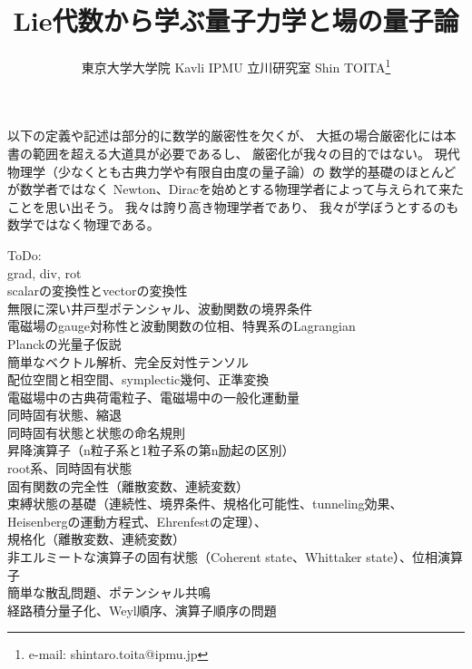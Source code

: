 \documentclass[dvipdfmx]{jsarticle}
\title{Lie代数から学ぶ量子力学と場の量子論}
\author{東京大学大学院 Kavli IPMU 立川研究室 \hspace{15pt}Shin TOITA\thanks{e-mail: shintaro.toita@ipmu.jp}}
\begin{document}
\maketitle
\vspace{-4zh}

\tableofcontents
\newpage

以下の定義や記述は部分的に数学的厳密性を欠くが、
大抵の場合厳密化には本書の範囲を超える大道具が必要であるし、
厳密化が我々の目的ではない。
現代物理学（少なくとも古典力学や有限自由度の量子論）の
数学的基礎のほとんどが数学者ではなく
Newton、Diracを始めとする物理学者によって与えられて来たことを思い出そう。
我々は誇り高き物理学者であり、
我々が学ぼうとするのも数学ではなく物理である。

ToDo:
\\grad, div, rot
\\scalarの変換性とvectorの変換性
\\無限に深い井戸型ポテンシャル、波動関数の境界条件
\\電磁場のgauge対称性と波動関数の位相、特異系のLagrangian
\\Planckの光量子仮説 
\\簡単なベクトル解析、完全反対性テンソル
\\配位空間と相空間、symplectic幾何、正準変換
\\電磁場中の古典荷電粒子、電磁場中の一般化運動量
\\同時固有状態、縮退
\\同時固有状態と状態の命名規則
\\昇降演算子（n粒子系と1粒子系の第n励起の区別）
\\root系、同時固有状態
\\固有関数の完全性（離散変数、連続変数）
\\束縛状態の基礎（連続性、境界条件、規格化可能性、tunneling効果、
\\Heisenbergの運動方程式、Ehrenfestの定理）、
\\規格化（離散変数、連続変数）
\\非エルミートな演算子の固有状態（Coherent state、Whittaker state）、位相演算子
\\簡単な散乱問題、ポテンシャル共鳴
\\経路積分量子化、Weyl順序、演算子順序の問題

\newpage

\newpage

\newpage


\end{document}
